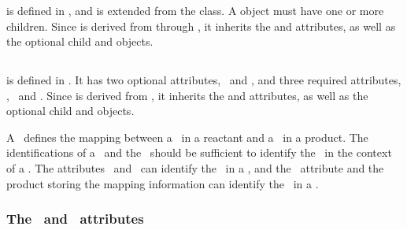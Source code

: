 \subsubsection{}
\label{def:ListOfSpeciesTypeComponentMapsInProduct}

 is defined in , and is extended from the  class. \mBlockChangedBegin{\revTwentyTwentyMarch} A  object\mBlockChangedEnd{\revTwentyTwentyMarch} must have one or more \SpeciesTypeComponentMapInProduct children.  Since  is derived from  through , it inherits the  and  attributes, as well as the optional \mBlockChangedBegin{\revTwentyTwentyMarch}child\mBlockChangedEnd{\revTwentyTwentyMarch}  and  objects. 


\subsection{}
\label{def:SpeciesTypeComponentMapInProduct}

 is defined in . It has two optional attributes, \idAtt\ and \nameAtt, and three required attributes, \reactantAtt, \reactantComponentAtt\ and \productComponentAtt. Since  is derived from , it inherits the  and  attributes, as well as the optional \mBlockChangedBegin{\revTwentyTwentyMarch}child\mBlockChangedEnd{\revTwentyTwentyMarch}  and  objects. 

A \speciesTypeComponentMapInProduct\ defines the mapping between a \component\ in a reactant and a \component\ in a product.  The identifications of a \componentWR\ and the \speciesReference\ should be sufficient to identify the \component\ in the context of a \reaction. The attributes \reactantAtt\ and \reactantComponentAtt\ can identify the \component\ in a \reactant, and the \productComponentAtt\ attribute and the product storing the mapping information can identify the \component\ in a \product. 


\subsubsection{The \idAtt\ and \nameAtt\ attributes}
\label{def:SpeciesTypeComponentMapInProduct:idAndName}

